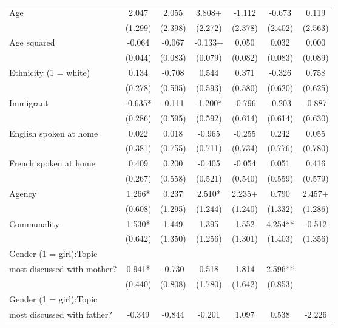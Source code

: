 \documentclass[
  letterpaper,
  DIV=11,
  numbers=noendperiod]{scrreprt}
\begin{document}
\begin{table}
\begin{tabular}[t]{lcccccc}
Age & 2.047 & 2.055 & 3.808+ & -1.112 & -0.673 & 0.119\\
\hspace{1em} & (1.299) & (2.398) & (2.272) & (2.378) & (2.402) & (2.563)\\
Age squared & -0.064 & -0.067 & -0.133+ & 0.050 & 0.032 & 0.000\\
\hspace{1em} & (0.044) & (0.083) & (0.079) & (0.082) & (0.083) & (0.089)\\
Ethnicity (1 = white) & 0.134 & -0.708 & 0.544 & 0.371 & -0.326 & 0.758\\
\hspace{1em} & (0.278) & (0.595) & (0.593) & (0.580) & (0.620) & (0.625)\\
Immigrant & -0.635* & -0.111 & -1.200* & -0.796 & -0.203 & -0.887\\
\hspace{1em} & (0.286) & (0.595) & (0.592) & (0.614) & (0.614) & (0.630)\\
English spoken at home & 0.022 & 0.018 & -0.965 & -0.255 & 0.242 & 0.055\\
\hspace{1em} & (0.381) & (0.755) & (0.711) & (0.734) & (0.776) & (0.780)\\
French spoken at home & 0.409 & 0.200 & -0.405 & -0.054 & 0.051 & 0.416\\
\hspace{1em} & (0.267) & (0.558) & (0.521) & (0.540) & (0.559) & (0.579)\\
Agency & 1.266* & 0.237 & 2.510* & 2.235+ & 0.790 & 2.457+\\
\hspace{1em} & (0.608) & (1.295) & (1.244) & (1.240) & (1.332) & (1.286)\\
Communality & 1.530* & 1.449 & 1.395 & 1.552 & 4.254** & -0.512\\
\hspace{1em} & (0.642) & (1.350) & (1.256) & (1.301) & (1.403) & (1.356)\\
Gender (1 = girl):Topic\\
most discussed with mother? & 0.941* & -0.730 & 0.518 & 1.814 & 2.596** & \\
\hspace{1em} & (0.440) & (0.808) & (1.780) & (1.642) & (0.853) & \\
Gender (1 = girl):Topic\\
most discussed with father? & -0.349 & -0.844 & -0.201 & 1.097 & 0.538 & -2.226\\

\end{tabular}
\end{table}
\end{document}
